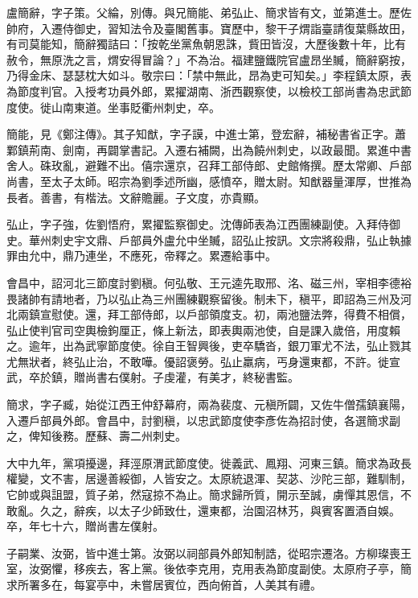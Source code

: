 \begin{pinyinscope}
 盧簡辭，字子策。父綸，別傳。與兄簡能、弟弘止、簡求皆有文，並第進士。歷佐帥府，入遷侍御史，習知法令及臺閣舊事。寶歷中，黎干子煟詣臺請復葉縣故田，有司莫能知，簡辭獨詰曰：「按乾坐黨魚朝恩誅，貲田皆沒，大歷後數十年，比有赦令，無原洗之言，煟安得冒論？」不為治。福建鹽鐵院官盧昂坐贓，簡辭窮按，乃得金床、瑟瑟枕大如斗。敬宗曰：「禁中無此，昂為吏可知矣。」李程鎮太原，表為節度判官。入授考功員外郎，累擢湖南、浙西觀察使，以檢校工部尚書為忠武節度使。徙山南東道。坐事貶衢州刺史，卒。



 簡能，見《鄭注傳》。其子知猷，字子謨，中進士第，登宏辭，補秘書省正字。蕭鄴鎮荊南、劍南，再闢掌書記。入遷右補闕，出為饒州刺史，以政最聞。累進中書舍人。硃玫亂，避難不出。僖宗還京，召拜工部侍郎、史館脩撰。歷太常卿、戶部尚書，至太子太師。昭宗為劉季述所幽，感憤卒，贈太尉。知猷器量渾厚，世推為長者。善書，有楷法。文辭贍麗。子文度，亦貴顯。



 弘止，字子強，佐劉悟府，累擢監察御史。沈傳師表為江西團練副使。入拜侍御史。華州刺史宇文鼎、戶部員外盧允中坐贓，詔弘止按訊。文宗將殺鼎，弘止執據罪由允中，鼎乃連坐，不應死，帝釋之。累遷給事中。



 會昌中，詔河北三節度討劉稹。何弘敬、王元逵先取邢、洺、磁三州，宰相李德裕畏諸帥有請地者，乃以弘止為三州團練觀察留後。制未下，稹平，即詔為三州及河北兩鎮宣慰使。還，拜工部侍郎，以戶部領度支。初，兩池鹽法弊，得費不相償，弘止使判官司空輿檢鉤厘正，條上新法，即表輿兩池使，自是課入歲倍，用度賴之。逾年，出為武寧節度使。徐自王智興後，吏卒驕沓，銀刀軍尤不法，弘止戮其尤無狀者，終弘止治，不敢嘩。優詔褒勞。弘止羸病，丐身還東都，不許。徙宣武，卒於鎮，贈尚書右僕射。子虔灌，有美才，終秘書監。



 簡求，字子臧，始從江西王仲舒幕府，兩為裴度、元稹所闢，又佐牛僧孺鎮襄陽，入遷戶部員外郎。會昌中，討劉稹，以忠武節度使李彥佐為招討使，各選簡求副之，俾知後務。歷蘇、壽二州刺史。



 大中九年，黨項擾邊，拜涇原渭武節度使。徙義武、鳳翔、河東三鎮。簡求為政長權變，文不害，居邊善綏御，人皆安之。太原統退渾、契苾、沙陀三部，難馴制，它帥或與詛盟，質子弟，然寇掠不為止。簡求歸所質，開示至誠，虜憚其恩信，不敢亂。久之，辭疾，以太子少師致仕，還東都，治園沼林艿，與賓客置酒自娛。卒，年七十六，贈尚書左僕射。



 子嗣業、汝弼，皆中進士第。汝弼以祠部員外郎知制誥，從昭宗遷洛。方柳璨喪王室，汝弼懼，移疾去，客上黨。後依李克用，克用表為節度副使。太原府子亭，簡求所署多在，每宴亭中，未嘗居賓位，西向俯首，人美其有禮。




\end{pinyinscope}
